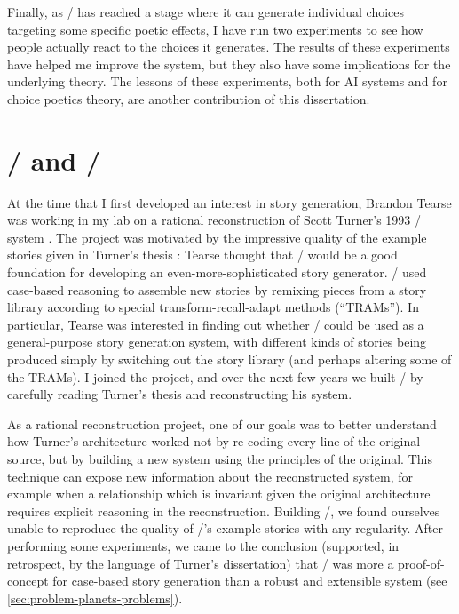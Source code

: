 Finally, as \dunyazad/ has reached a stage where it can generate individual choices targeting some specific poetic effects, I have run two experiments to see how people actually react to the choices it generates.
%
The results of these experiments have helped me improve the system, but they also have some implications for the underlying theory.
%
The lessons of these experiments, both for AI systems and for choice poetics theory, are another contribution of this dissertation.



\section{\minstrel/ and \skald/}

At the time that I first developed an interest in story generation, Brandon Tearse was working in my lab on a rational reconstruction of Scott Turner's 1993 \minstrel/ system \citep{Turner1993}.
%
The project was motivated by the impressive quality of the example stories given in Turner's thesis \citep{Turner1993}: Tearse thought that \minstrel/ would be a good foundation for developing an even-more-sophisticated story generator.
%
\minstrel/ used case-based reasoning to assemble new stories by remixing pieces from a story library according to special transform-recall-adapt methods (``TRAMs'').
%
In particular, Tearse was interested in finding out whether \minstrel/ could be used as a general-purpose story generation system, with different kinds of stories being produced simply by switching out the story library (and perhaps altering some of the TRAMs).
%
I joined the project, and over the next few years we built \skald/ by carefully reading Turner's thesis and reconstructing his system.


As a rational reconstruction project, one of our goals was to better understand how Turner's architecture worked not by re-coding every line of the original source, but by building a new system using the principles of the original.
%
This technique can expose new information about the reconstructed system, for example when a relationship which is invariant given the original architecture requires explicit reasoning in the reconstruction.
%
Building \skald/, we found ourselves unable to reproduce the quality of \minstrel/'s example stories with any regularity.
%
After performing some experiments, we came to the conclusion (supported, in retrospect, by the language of Turner's dissertation) that \minstrel/ was more a proof-of-concept for case-based story generation than a robust and extensible system (see \cref{sec:problem-planets-problems}).


